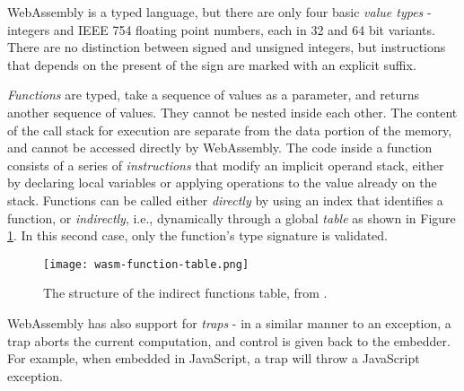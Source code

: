\vspace*{0.5cm}


WebAssembly is a typed language, but there are only four basic \textit{value types} - integers and IEEE 754 floating
point numbers, each in 32 and 64 bit variants. There are no distinction between signed and unsigned integers,
but instructions that depends on the present of the sign are marked with an explicit suffix.

\textit{Functions} are typed, take a sequence of values as a parameter, and returns another sequence of values.
They cannot be nested inside each other. The content of the call stack for execution are separate from the data
portion of the memory, and cannot be accessed directly by WebAssembly.
The code inside a function consists of a series of \textit{instructions} that modify an implicit operand stack,
either by declaring local variables or applying operations to the value already on the stack.
Functions can be called either \textit{directly} by using an index that identifies a function, or \textit{indirectly},
i.e., dynamically through a global \textit{table} as shown in Figure \ref{fig:indirect-function-table-structure}.
In this second case, only the function's type signature is validated.

\begin{figure}[ht]
  \centering
  \texttt{[image: wasm-function-table.png]}
  \caption{The structure of the indirect functions table, from \cite{binary-security-wasm-2020}.}
  \label{fig:indirect-function-table-structure}
\end{figure}

WebAssembly has also support for \textit{traps} - in a similar manner to an exception, a trap aborts the current
computation, and control is given back to the embedder. For example, when embedded in JavaScript, a trap will
throw a JavaScript exception.

